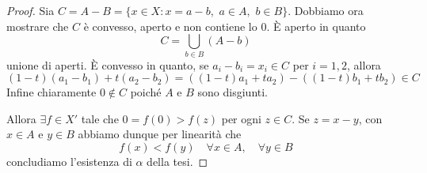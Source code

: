 \begin{proof}{}
    Sia \(C = A - B = \{x \in X : x = a-b, \,\, a \in A, \,\, b \in B\} \).
    Dobbiamo ora mostrare che \(C\) è convesso, aperto e non contiene lo 0. È
    aperto in quanto
    \[
      C = \bigcup_{b \in B} {(A - b)} 
    \]
    unione di aperti. È convesso in quanto, se \(a_{i} - b_{i} = x_{i} \in C\)
    per \(i = 1,2\), allora
    \[
      {(1-t)}{(a_{1} - b_{1})} + t {(a_{2} -b_{2})} = ({(1-t)}a_{1} + ta_{2}) - {({(1-t)}b_{1} + tb_{2})} \in C
    \]
    Infine chiaramente \(0 \not\in C\) poiché \(A\) e \(B\) sono disgiunti.

    Allora \(\exists f \in X'\) tale che \(0 = f{(0)} > f{(z)}\) per ogni \(z
    \in C\). Se \(z = x-y\), con \(x \in A\) e \(y \in B\) abbiamo dunque per
    linearità che
    \[
      f{(x)} < f{(y)} \quad \forall x \in A, \quad \forall y \in B
    \]
    concludiamo l'esistenza di \(\alpha\) della tesi.
\end{proof}

